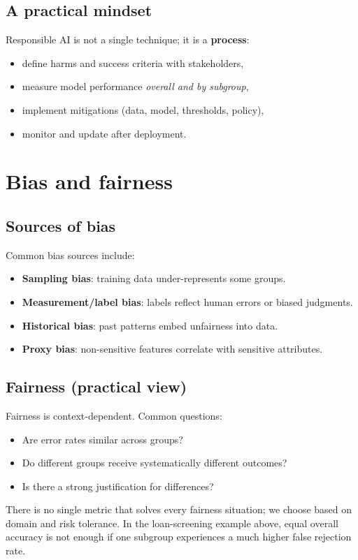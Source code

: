 \documentclass[11pt]{article}
\begin{document}
\subsection{A practical mindset}
Responsible AI is not a single technique; it is a \textbf{process}:
\begin{itemize}[leftmargin=*]
  \item define harms and success criteria with stakeholders,
  \item measure model performance \emph{overall and by subgroup},
  \item implement mitigations (data, model, thresholds, policy),
  \item monitor and update after deployment.
\end{itemize}

\section{Bias and fairness}
\subsection{Sources of bias}
Common bias sources include:
\begin{itemize}[leftmargin=*]
  \item \textbf{Sampling bias}: training data under-represents some groups.
  \item \textbf{Measurement/label bias}: labels reflect human errors or biased judgments.
  \item \textbf{Historical bias}: past patterns embed unfairness into data.
  \item \textbf{Proxy bias}: non-sensitive features correlate with sensitive attributes.
\end{itemize}

\subsection{Fairness (practical view)}
Fairness is context-dependent. Common questions:
\begin{itemize}[leftmargin=*]
  \item Are error rates similar across groups?
  \item Do different groups receive systematically different outcomes?
  \item Is there a strong justification for differences?
\end{itemize}
There is no single metric that solves every fairness situation; we choose based on domain and risk tolerance.
In the loan-screening example above, equal overall accuracy is not enough if one subgroup experiences a much higher false rejection rate.
\end{document}
